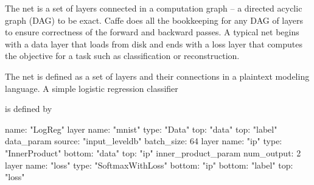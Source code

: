 The net is a set of layers connected in a computation graph -- a directed acyclic graph (D\+AG) to be exact. Caffe does all the bookkeeping for any D\+AG of layers to ensure correctness of the forward and backward passes. A typical net begins with a data layer that loads from disk and ends with a loss layer that computes the objective for a task such as classification or reconstruction.

The net is defined as a set of layers and their connections in a plaintext modeling language. A simple logistic regression classifier



is defined by \begin{DoxyVerb}name: "LogReg"
layer {
  name: "mnist"
  type: "Data"
  top: "data"
  top: "label"
  data_param {
    source: "input_leveldb"
    batch_size: 64
  }
}
layer {
  name: "ip"
  type: "InnerProduct"
  bottom: "data"
  top: "ip"
  inner_product_param {
    num_output: 2
  }
}
layer {
  name: "loss"
  type: "SoftmaxWithLoss"
  bottom: "ip"
  bottom: "label"
  top: "loss"
}
\end{DoxyVerb}


